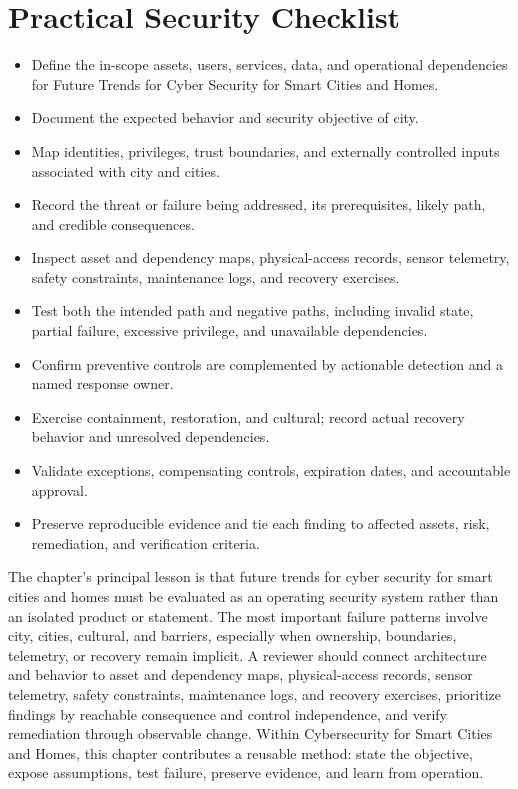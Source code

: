 \documentclass[11pt]{article}
\begin{document}
\section*{Practical Security Checklist}
\begin{itemize}[label=$\square$]
\item Define the in-scope assets, users, services, data, and operational dependencies for Future Trends for Cyber Security for Smart Cities and Homes.
\item Document the expected behavior and security objective of city.
\item Map identities, privileges, trust boundaries, and externally controlled inputs associated with city and cities.
\item Record the threat or failure being addressed, its prerequisites, likely path, and credible consequences.
\item Inspect asset and dependency maps, physical-access records, sensor telemetry, safety constraints, maintenance logs, and recovery exercises.
\item Test both the intended path and negative paths, including invalid state, partial failure, excessive privilege, and unavailable dependencies.
\item Confirm preventive controls are complemented by actionable detection and a named response owner.
\item Exercise containment, restoration, and cultural; record actual recovery behavior and unresolved dependencies.
\item Validate exceptions, compensating controls, expiration dates, and accountable approval.
\item Preserve reproducible evidence and tie each finding to affected assets, risk, remediation, and verification criteria.
\end{itemize}
\begin{synthesisbox}
The chapter's principal lesson is that future trends for cyber security for smart cities and homes must be evaluated as an operating security system rather than an isolated product or statement. The most important failure patterns involve city, cities, cultural, and barriers, especially when ownership, boundaries, telemetry, or recovery remain implicit. A reviewer should connect architecture and behavior to asset and dependency maps, physical-access records, sensor telemetry, safety constraints, maintenance logs, and recovery exercises, prioritize findings by reachable consequence and control independence, and verify remediation through observable change. Within Cybersecurity for Smart Cities and Homes, this chapter contributes a reusable method: state the objective, expose assumptions, test failure, preserve evidence, and learn from operation.
\end{synthesisbox}
\end{document}
